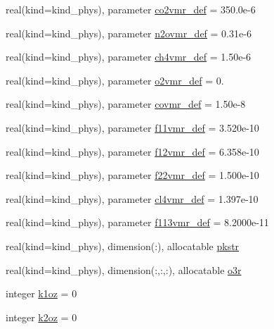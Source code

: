 \begin{DoxyCompactItemize}
\item 
real(kind=kind\+\_\+phys), parameter \hyperlink{group__module__radiation__gases_ga4fb5ca2e3bfaed7848d7602a22499e76}{co2vmr\+\_\+def} = 350.\+0e-\/6
\item 
real(kind=kind\+\_\+phys), parameter \hyperlink{group__module__radiation__gases_ga858ad802efe755f8b4b5bde85996b6ae}{n2ovmr\+\_\+def} = 0.\+31e-\/6
\item 
real(kind=kind\+\_\+phys), parameter \hyperlink{group__module__radiation__gases_gaad928d9e0064905a0b6e1eb8bb59bd23}{ch4vmr\+\_\+def} = 1.\+50e-\/6
\item 
real(kind=kind\+\_\+phys), parameter \hyperlink{group__module__radiation__gases_ga910898e96b8afe92ebc82ce62ba682d8}{o2vmr\+\_\+def} = 0.
\item 
real(kind=kind\+\_\+phys), parameter \hyperlink{group__module__radiation__gases_ga3554bdf03f8222d425bb6c946244cbb5}{covmr\+\_\+def} = 1.\+50e-\/8
\item 
real(kind=kind\+\_\+phys), parameter \hyperlink{group__module__radiation__gases_ga23ae6bb6860bfefef0c281b7106f521e}{f11vmr\+\_\+def} = 3.\+520e-\/10
\item 
real(kind=kind\+\_\+phys), parameter \hyperlink{group__module__radiation__gases_ga96d4f78070f30010626e0824b3421250}{f12vmr\+\_\+def} = 6.\+358e-\/10
\item 
real(kind=kind\+\_\+phys), parameter \hyperlink{group__module__radiation__gases_gafd0018e96811ac64ef2abd8cab821eb5}{f22vmr\+\_\+def} = 1.\+500e-\/10
\item 
real(kind=kind\+\_\+phys), parameter \hyperlink{group__module__radiation__gases_ga013f8faaee6df0c7c032e1786770c110}{cl4vmr\+\_\+def} = 1.\+397e-\/10
\item 
real(kind=kind\+\_\+phys), parameter \hyperlink{group__module__radiation__gases_ga76ec88dc6284c48cfaae6cd05428b6dd}{f113vmr\+\_\+def} = 8.\+2000e-\/11
\item 
real(kind=kind\+\_\+phys), dimension(\+:), allocatable \hyperlink{group__module__radiation__gases_gac7466def3963591ebfc48298806b1f6a}{pkstr}
\item 
real(kind=kind\+\_\+phys), dimension(\+:,\+:,\+:), allocatable \hyperlink{group__module__radiation__gases_gad18392d991a9ef4b6ff0e8e822176a18}{o3r}
\item 
integer \hyperlink{group__module__radiation__gases_ga0a14666484f230d3506a9b4740e2eeda}{k1oz} = 0
\item 
integer \hyperlink{group__module__radiation__gases_ga0c3727c9e2a0bec46e84622c4591cd8b}{k2oz} = 0

\end{DoxyCompactItemize}
